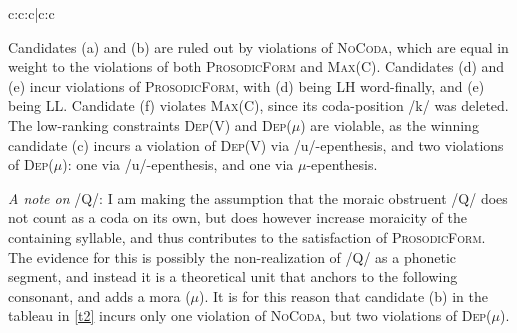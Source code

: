 \documentclass{article}
\begin{document}
\vspace{.25cm}

\begin{exe}
\ex
\label{t2}
\begin{tableau}{c:c:c|c:c}
                                             
               \vio{}            \vio{}                          \vio{*!}                   \vio{}                      \vio{}              
               \vio{}            \vio{}                       \vio{*!}                   \vio{}                         \vio{*}           
   \vio{}            \vio{}                         \vio{}                    \vio{*}                        \vio{**}
             \vio{}            \vio{*!}                         \vio{}                    \vio{*}                        \vio{**} 
               \vio{}            \vio{*!}                          \vio{}                   \vio{*}                       \vio{*}
                   \vio{*!}           \vio{}                          \vio{}                  \vio{}                            \vio{}
\end{tableau}
\end{exe}
\vspace{.5cm}

Candidates (a) and (b) are ruled out by violations of \textsc{NoCoda}, which are equal in weight to the violations of both \textsc{ProsodicForm} and \textsc{Max(C)}. Candidates (d) and (e) incur violations of \textsc{ProsodicForm}, with (d) being LH word-finally, and (e) being LL. Candidate (f) violates \textsc{Max(C)}, since its coda-position /k/ was deleted. The low-ranking constraints \textsc{Dep(V)} and \textsc{Dep($\mu$)} are violable, as the winning candidate (c) incurs a violation of \textsc{Dep(V)} via /u/-epenthesis, and two violations of \textsc{Dep($\mu$)}: one via /u/-epenthesis, and one via $\mu$-epenthesis.

\textit{A note on} /Q/: I am making the assumption that the moraic obstruent /Q/ does not count as a coda on its own, but does however increase moraicity of the containing syllable, and thus contributes to the satisfaction of \textsc{ProsodicForm}. The evidence for this is possibly the non-realization of /Q/ as a phonetic segment, and instead it is a theoretical unit that anchors to the following consonant, and adds a mora ($\mu$). It is for this reason that candidate (b) in the tableau in \ref{t2} incurs only one violation of \textsc{NoCoda}, but two violations of \textsc{Dep($\mu$)}.
\end{document}
